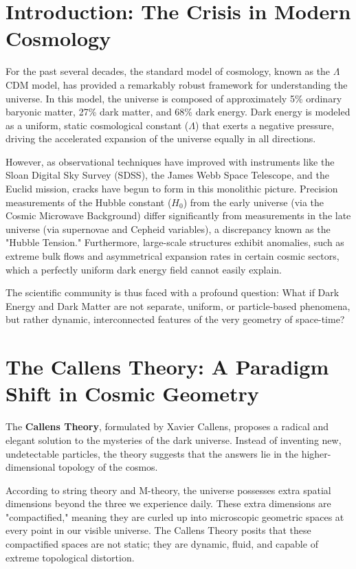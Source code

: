 \documentclass[a4paper,12pt]{article}
\begin{document}
\section{Introduction: The Crisis in Modern Cosmology}
For the past several decades, the standard model of cosmology, known as the $\Lambda$CDM model, has provided a remarkably robust framework for understanding the universe. In this model, the universe is composed of approximately 5\% ordinary baryonic matter, 27\% dark matter, and 68\% dark energy. Dark energy is modeled as a uniform, static cosmological constant ($\Lambda$) that exerts a negative pressure, driving the accelerated expansion of the universe equally in all directions.

However, as observational techniques have improved with instruments like the Sloan Digital Sky Survey (SDSS), the James Webb Space Telescope, and the Euclid mission, cracks have begun to form in this monolithic picture. Precision measurements of the Hubble constant ($H_0$) from the early universe (via the Cosmic Microwave Background) differ significantly from measurements in the late universe (via supernovae and Cepheid variables), a discrepancy known as the "Hubble Tension." Furthermore, large-scale structures exhibit anomalies, such as extreme bulk flows and asymmetrical expansion rates in certain cosmic sectors, which a perfectly uniform dark energy field cannot easily explain.

The scientific community is thus faced with a profound question: What if Dark Energy and Dark Matter are not separate, uniform, or particle-based phenomena, but rather dynamic, interconnected features of the very geometry of space-time?

\section{The Callens Theory: A Paradigm Shift in Cosmic Geometry}
The \textbf{Callens Theory}, formulated by Xavier Callens, proposes a radical and elegant solution to the mysteries of the dark universe. Instead of inventing new, undetectable particles, the theory suggests that the answers lie in the higher-dimensional topology of the cosmos.

According to string theory and M-theory, the universe possesses extra spatial dimensions beyond the three we experience daily. These extra dimensions are "compactified," meaning they are curled up into microscopic geometric spaces at every point in our visible universe. The Callens Theory posits that these compactified spaces are not static; they are dynamic, fluid, and capable of extreme topological distortion.
\end{document}
